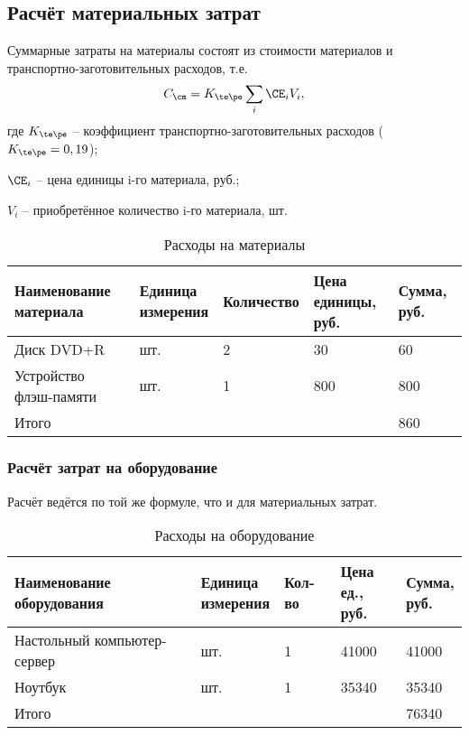 \subsection{Расчёт материальных затрат}
Суммарные затраты на материалы состоят из стоимости материалов и транспортно-заготовительных расходов, т.е. 
\begin{equation*}
    C_{\cm} = K_{\te\pe} \sum_{i} \CE_i V_i,
\end{equation*}
где $K_{\te\pe}$ -- коэффициент транспортно-заготовительных расходов ($K_{\te\pe} = 0,19$);

$\CE_i$ -- цена единицы i-го материала, руб.;

$V_i$ -- приобретённое количество i-го материала, шт.

\begin{table}[H]
    \caption{\label{tab:materials}Расходы на материалы}
    \begin{tabular}[H]{|l|l|l|l|l|}
        \hline
        \specialcell{Наименование\\материала} & \specialcell{Единица\\измерения} & Количество & \specialcell{Цена\\единицы, руб.} & Сумма, руб.\\
        \hline
        Диск DVD+R & шт. & 2 & 30 & 60\\
        \hline
        Устройство флэш-памяти & шт. & 1 & 800 & 800\\
        \hline
        Итого &  &  &  & 860\\
        \hline
    \end{tabular}
\end{table}

\subsubsection{Расчёт затрат на оборудование}

Расчёт ведётся по той же формуле, что и для материальных затрат.

\begin{table}[H]
    \caption{\label{tab:devices}Расходы на оборудование}
    \begin{tabular}[H]{|l|l|l|l|l|}
        \hline
        \specialcell{Наименование\\оборудования} & \specialcell{Единица\\измерения} & Кол-во & \specialcell{Цена\\ед., руб.} & \specialcell{Сумма,\\руб.}\\
        \hline
        Настольный компьютер-сервер & шт. & 1 & 41000 & 41000\\
        \hline
        Ноутбук & шт. & 1 & 35340 & 35340\\
        \hline
        Итого &  &  &  & 76340\\
        \hline
    \end{tabular}
\end{table}

